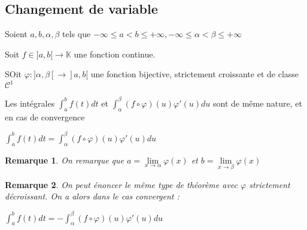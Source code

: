 \documentclass[a4paper,12pt]{book}
\newcommand{\Thr}[2]{\begin{tcolorbox}[sharp corners, colback=white,colframe=red!90!black!75, title=Théorème : #1]#2\end{tcolorbox}}
\newtheorem{Rem}{Remarque}[section]
\def\K{\mathbb{K}}
\begin{document}
\subsection{Changement de variable}
\Thr{}{Soient $a,b,\alpha, \beta$ tels que $-\infty\leq a<b\leq +\infty, -\infty\leq\alpha<\beta\leq+\infty$ \par Soit $f\in]a,b[\to \K$ une fonction continue. \par SOit $\varphi:]\alpha,\beta[\to]a,b[$ une fonction bijective, strictement croissante et de classe $\mathcal{C}^1$
\par Les intégrales $\int_a^bf(t)dt$ et $\int_\alpha^\beta(f\circ\varphi)(u)\varphi'(u)du$ sont de même nature, et en cas de convergence \par\begin{center}$\int_a^bf(t)dt=\int_\alpha^\beta(f\circ\varphi)(u)\varphi'(u)du$\end{center}}
\begin{Rem}
On remarque que $a=\lim\limits_{x\to\alpha}\varphi(x)$ et $b=\lim\limits_{x\to\beta}\varphi(x)$
\end{Rem}
\begin{Rem}
On peut énoncer le même type de théorème avec $\varphi$ strictement décroissant. On a alors dans le cas convergent : \par\begin{center}$\int_a^bf(t)dt=-\int_\alpha^\beta(f\circ\varphi)(u)\varphi'(u)du$\end{center}
\end{Rem}
\end{document}
